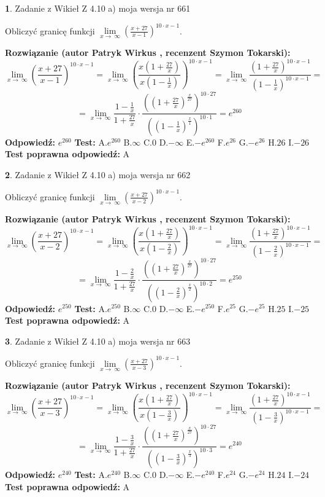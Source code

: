 \documentclass[12pt, a4paper]{article}
\theoremstyle{definition} %
\newtheorem{zad}{}
\newcommand{\zadStart}[1]{\begin{zad}#1\newline}
\newcommand{\zadStop}{\end{zad}}
\newcommand{\rozwStart}[2]{\noindent \textbf{Rozwiązanie (autor #1 , recenzent #2): }\newline}
\newcommand{\rozwStop}{\newline}
\newcommand{\odpStart}{\noindent \textbf{Odpowiedź:}\newline}
\newcommand{\odpStop}{\newline}
\newcommand{\testStart}{\noindent \textbf{Test:}\newline}
\newcommand{\testStop}{\newline}
\newcommand{\kluczStart}{\noindent \textbf{Test poprawna odpowiedź:}\newline}
\newcommand{\kluczStop}{\newline}
\begin{document}
\zadStart{Zadanie z Wikieł Z 4.10 a) moja wersja nr 661}

Obliczyć granicę funkcji  $\lim\limits_{x\to\ \infty}(\frac{x+27}{x-1})^{10\cdot x-1}$.
\zadStop
\rozwStart{Patryk Wirkus}{Szymon Tokarski}
$$\lim\limits_{x\to\ \infty}(\frac{x+27}{x-1})^{10\cdot x-1} = \lim\limits_{x\to\ \infty}(\frac{x(1+\frac{27}{x})}{x(1-\frac{1}{x})})^{10\cdot x-1}=\lim\limits_{x\to\ \infty}\frac{(1+\frac{27}{x})^{10\cdot x-1}}{(1-\frac{1}{x})^{10\cdot x-1}}=$$
$$=\lim\limits_{x\to\ \infty}\frac{1-\frac{1}{x}}{1+\frac{27}{x}}\cdot\frac{((1+\frac{27}{x})^{\frac{x}{27}})^{10\cdot27}}{((1-\frac{1}{x})^{\frac{x}{1}})^{10\cdot1}}=e^{260}$$
\rozwStop
\odpStart
$e^{260}$
\odpStop
\testStart
A.$e^{260}$ B.$\infty$ C.$0$ D.$-\infty$ E.$-e^{260}$
F.$e^{26}$ G.$-e^{26}$
H.$26$
I.$-26$
\testStop
\kluczStart
A
\kluczStop



\zadStart{Zadanie z Wikieł Z 4.10 a) moja wersja nr 662}

Obliczyć granicę funkcji  $\lim\limits_{x\to\ \infty}(\frac{x+27}{x-2})^{10\cdot x-1}$.
\zadStop
\rozwStart{Patryk Wirkus}{Szymon Tokarski}
$$\lim\limits_{x\to\ \infty}(\frac{x+27}{x-2})^{10\cdot x-1} = \lim\limits_{x\to\ \infty}(\frac{x(1+\frac{27}{x})}{x(1-\frac{2}{x})})^{10\cdot x-1}=\lim\limits_{x\to\ \infty}\frac{(1+\frac{27}{x})^{10\cdot x-1}}{(1-\frac{2}{x})^{10\cdot x-1}}=$$
$$=\lim\limits_{x\to\ \infty}\frac{1-\frac{2}{x}}{1+\frac{27}{x}}\cdot\frac{((1+\frac{27}{x})^{\frac{x}{27}})^{10\cdot27}}{((1-\frac{2}{x})^{\frac{x}{2}})^{10\cdot2}}=e^{250}$$
\rozwStop
\odpStart
$e^{250}$
\odpStop
\testStart
A.$e^{250}$ B.$\infty$ C.$0$ D.$-\infty$ E.$-e^{250}$
F.$e^{25}$ G.$-e^{25}$
H.$25$
I.$-25$
\testStop
\kluczStart
A
\kluczStop



\zadStart{Zadanie z Wikieł Z 4.10 a) moja wersja nr 663}

Obliczyć granicę funkcji  $\lim\limits_{x\to\ \infty}(\frac{x+27}{x-3})^{10\cdot x-1}$.
\zadStop
\rozwStart{Patryk Wirkus}{Szymon Tokarski}
$$\lim\limits_{x\to\ \infty}(\frac{x+27}{x-3})^{10\cdot x-1} = \lim\limits_{x\to\ \infty}(\frac{x(1+\frac{27}{x})}{x(1-\frac{3}{x})})^{10\cdot x-1}=\lim\limits_{x\to\ \infty}\frac{(1+\frac{27}{x})^{10\cdot x-1}}{(1-\frac{3}{x})^{10\cdot x-1}}=$$
$$=\lim\limits_{x\to\ \infty}\frac{1-\frac{3}{x}}{1+\frac{27}{x}}\cdot\frac{((1+\frac{27}{x})^{\frac{x}{27}})^{10\cdot27}}{((1-\frac{3}{x})^{\frac{x}{3}})^{10\cdot3}}=e^{240}$$
\rozwStop
\odpStart
$e^{240}$
\odpStop
\testStart
A.$e^{240}$ B.$\infty$ C.$0$ D.$-\infty$ E.$-e^{240}$
F.$e^{24}$ G.$-e^{24}$
H.$24$
I.$-24$
\testStop
\kluczStart
A
\kluczStop
\end{document}
